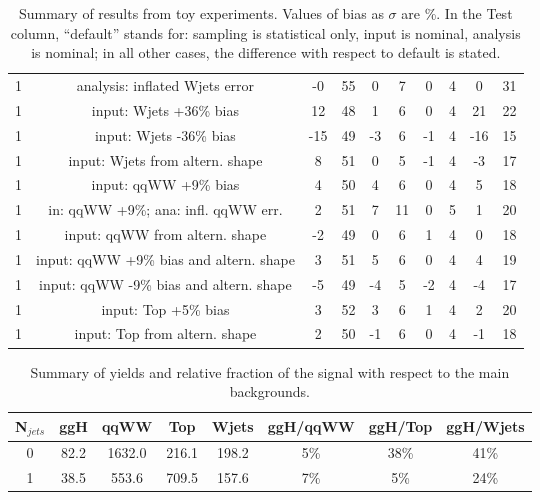 \begin{table}
\begin{center}
\begin{tabular}{c | c  | c c | c c | c c | c c}
\hline
1 & analysis: inflated Wjets error      &-0  & 55 & 0 & 7  & 0 & 4 & 0  & 31 \\
1 & input: Wjets +36\% bias             & 12 & 48 & 1 & 6  & 0 & 4 & 21 & 22 \\
1 & input: Wjets -36\% bias             &-15 & 49 &-3 & 6  &-1 & 4 &-16 & 15 \\
1 & input: Wjets from altern. shape     & 8  & 51 & 0 & 5  &-1 & 4 &-3  & 17 \\
\hline
1 & input: qqWW +9\% bias               & 4  & 50 & 4 & 6  & 0 & 4 & 5  & 18 \\
1 & in: qqWW +9\%; ana: infl. qqWW err. & 2  & 51 & 7 & 11 & 0 & 5 & 1  & 20 \\
1 & input: qqWW from altern. shape      &-2  & 49 & 0 & 6  & 1 & 4 & 0  & 18 \\
1 & input: qqWW +9\% bias and altern. shape & 3  & 51 & 5 & 6 & 0 & 4 & 4  & 19 \\
1 & input: qqWW -9\% bias and altern. shape &-5  & 49 &-4 & 5 &-2 & 4 &-4  & 17 \\
\hline
1 & input: Top +5\% bias                & 3  & 52 & 3 & 6  & 1 & 4 & 2  & 20 \\
1 & input: Top from altern. shape       & 2  & 50 &-1 & 6  & 0 & 4 &-1  & 18 \\
\hline
\hline
\end{tabular}
\caption{Summary of results from toy experiments. Values of bias as $\sigma$ are \%.
In the Test column, ``default'' stands for: sampling is statistical only, input is nominal, analysis is nominal; 
in all other cases, the difference with respect to default is stated.}
\label{tab:toy_summary}
\end{center}
\end{table}


\begin{table}
\begin{center}
\begin{tabular}{c | c c c c | c c c }
\hline
N$_{jets}$ & ggH & qqWW & Top & Wjets & ggH/qqWW & ggH/Top & ggH/Wjets \\
\hline
0 & 82.2 & 1632.0 & 216.1 & 198.2 & 5\% & 38\% & 41\% \\
1 & 38.5 &  553.6 & 709.5 & 157.6 & 7\% & 5\%  & 24\% \\
\hline
\end{tabular}
\caption{Summary of yields and relative fraction of the signal with respect to the main backgrounds.}
\label{tab:yield_summary}
\end{center}
\end{table}


